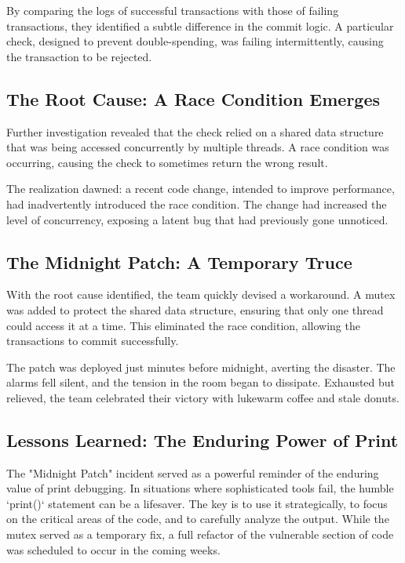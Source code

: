 \documentclass{article}
\begin{document}
{{{{By comparing the logs of successful transactions with those of failing transactions, they identified a subtle difference in the commit logic. A particular check, designed to prevent double-spending, was failing intermittently, causing the transaction to be rejected.

\subsection*{The Root Cause: A Race Condition Emerges}

Further investigation revealed that the check relied on a shared data structure that was being accessed concurrently by multiple threads. A race condition was occurring, causing the check to sometimes return the wrong result.

The realization dawned: a recent code change, intended to improve performance, had inadvertently introduced the race condition. The change had increased the level of concurrency, exposing a latent bug that had previously gone unnoticed.

\subsection*{The Midnight Patch: A Temporary Truce}

With the root cause identified, the team quickly devised a workaround. A mutex was added to protect the shared data structure, ensuring that only one thread could access it at a time. This eliminated the race condition, allowing the transactions to commit successfully.

The patch was deployed just minutes before midnight, averting the disaster. The alarms fell silent, and the tension in the room began to dissipate. Exhausted but relieved, the team celebrated their victory with lukewarm coffee and stale donuts.

\subsection*{Lessons Learned: The Enduring Power of Print}

The "Midnight Patch" incident served as a powerful reminder of the enduring value of print debugging. In situations where sophisticated tools fail, the humble `print()` statement can be a lifesaver. The key is to use it strategically, to focus on the critical areas of the code, and to carefully analyze the output. While the mutex served as a temporary fix, a full refactor of the vulnerable section of code was scheduled to occur in the coming weeks.

}}}}
\end{document}
